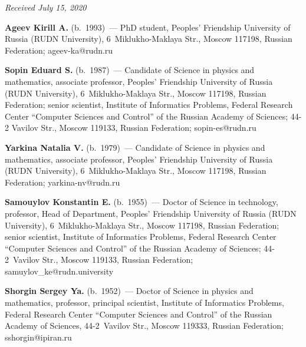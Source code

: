 \begin{multicols}{2}
{{\begin{thebibliography}{9}
\end{thebibliography}

 }
 }

\end{multicols}

\vspace*{-6pt}

\hfill{\small\textit{Received July 15, 2020}}





\Contr

\noindent
\textbf{Ageev Kirill A.} (b.\ 1993)~--- PhD student, Peoples' Friendship University of Russia (RUDN 
University), 6~Miklukho-Maklaya Str., Moscow 117198, Russian Federation; \mbox{ageev-ka@rudn.ru}

\vspace*{3pt}

\noindent
\textbf{Sopin Eduard S.} (b.\ 1987)~--- Candidate of Science in physics and mathematics, associate 
professor, Peoples' Friendship University of Russia (RUDN University), 6~Miklukho-Maklaya Str., 
Moscow 117198, Russian Federation; senior scientist, Institute of Informatics Problems, Federal Research 
Center ``Computer Sciences and Control'' of the Russian Academy of Sciences; 44-2 Vavilov Str., Moscow 
119133, Russian Federation; \mbox{sopin-es@rudn.ru}

\vspace*{3pt}

\noindent
\textbf{Yarkina Natalia V.} (b.\ 1979)~--- Candidate of Science in physics and mathematics, associate 
professor, Peoples' Friendship University of Russia (RUDN University), 6~Miklukho-Maklaya Str., 
Moscow 117198, Russian Federation; \mbox{yarkina-nv@rudn.ru}

\vspace*{3pt}

\noindent
\textbf{Samouylov Konstantin E.} (b.\ 1955)~--- Doctor of Science in technology, professor, Head of 
Department, Peoples' Friendship University of Russia (RUDN University), 6~Miklukho-Maklaya Str., 
Moscow 117198, Russian Federation; senior scientist, Institute of Informatics Problems, Federal Research 
Center ``Computer Sciences and Control'' of the Russian Academy of Sciences; 44-2~Vavilov Str., Moscow 
119133, Russian Federation; \mbox{samuylov\_ke@rudn.university}

\vspace*{3pt}

\noindent
\textbf{Shorgin Sergey Ya.} (b.\ 1952)~--- Doctor of Science in physics and mathematics, professor, 
principal scientist, Institute of Informatics Problems, Federal Research Center ``Computer Sciences and 
Control'' of the Russian Academy of Sciences, 44-2~Vavilov Str., Moscow 119333, Russian Federation; 
\mbox{sshorgin@ipiran.ru}
\label{end\stat}

\renewcommand{\bibname}{\protect\rm Литература} 